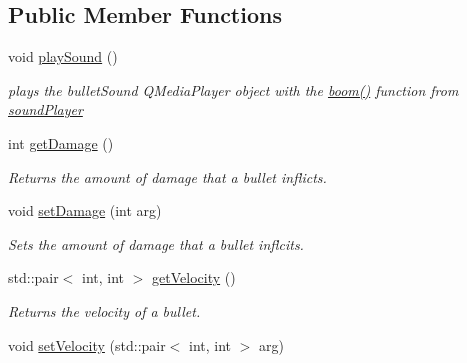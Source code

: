 \subsection*{Public Member Functions}
\begin{DoxyCompactItemize}
\item 
\mbox{\label{classBullet_ae06db7b162490a47736a5e8a61aa2d5f}} 
void \hyperlink{classBullet_ae06db7b162490a47736a5e8a61aa2d5f}{play\+Sound} ()
\begin{DoxyCompactList}\small\item\em plays the bullet\+Sound Q\+Media\+Player object with the \hyperlink{classsoundPlayer_a1d187e2c442666b8faa74d07a3694edb}{boom()} function from \hyperlink{classsoundPlayer}{sound\+Player} \end{DoxyCompactList}\item 
\mbox{\label{classBullet_a682701fa7f9d4a9564dbcd6ed3f73588}} 
int \hyperlink{classBullet_a682701fa7f9d4a9564dbcd6ed3f73588}{get\+Damage} ()
\begin{DoxyCompactList}\small\item\em Returns the amount of damage that a bullet inflicts. \end{DoxyCompactList}\item 
\mbox{\label{classBullet_aaa0132f847fa70a1fcaf165a33e638b1}} 
void \hyperlink{classBullet_aaa0132f847fa70a1fcaf165a33e638b1}{set\+Damage} (int arg)
\begin{DoxyCompactList}\small\item\em Sets the amount of damage that a bullet inflcits. \end{DoxyCompactList}\item 
\mbox{\label{classBullet_a00ffc9297154f11493f0a664ae2f4f40}} 
std\+::pair$<$ int, int $>$ \hyperlink{classBullet_a00ffc9297154f11493f0a664ae2f4f40}{get\+Velocity} ()
\begin{DoxyCompactList}\small\item\em Returns the velocity of a bullet. \end{DoxyCompactList}\item 
\mbox{\label{classBullet_a9dc2cc1401e02fdb9632ea8fac34cb11}} 
void \hyperlink{classBullet_a9dc2cc1401e02fdb9632ea8fac34cb11}{set\+Velocity} (std\+::pair$<$ int, int $>$ arg)

\end{DoxyCompactItemize}
